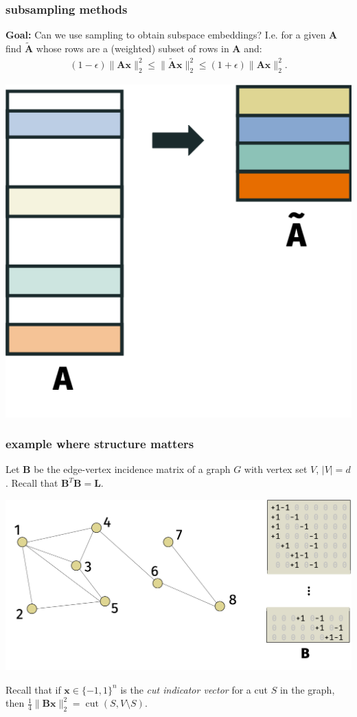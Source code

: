 \documentclass[compress]{beamer}
\newcommand{\bv}[1]{\mathbf{#1}}
\DeclareMathOperator{\cut}{cut}
\begin{document}
\begin{frame}
	\frametitle{subsampling methods}
	\textbf{Goal:} Can we use sampling to obtain subspace embeddings? I.e. for a given $\bv{A}$ find $\tilde{\bv{A}}$ whose rows are a (weighted) subset of rows in $\bv{A}$ and:
	\begin{align*}
		(1-\epsilon)\|\bv{A}\bv{x}\|_2^2 \leq \|\tilde{\bv{A}}\bv{x}\|_2^2 \leq (1+\epsilon)\|\bv{A}\bv{x}\|_2^2.
	\end{align*}
	\begin{center}
		\includegraphics[width=.4\textwidth]{subsampleA.png}
	\end{center}
	
	
\end{frame}

\begin{frame}
	\frametitle{example where structure matters}
	Let $\bv{B}$ be the edge-vertex incidence matrix of a graph $G$ with vertex set $V$, $|V| = d$. Recall that $\bv{B}^T\bv{B} = \bv{L}$.
	\begin{center}
		\includegraphics[width=\textwidth]{edge_vertex.png}
	\end{center}
	\vspace{-1em}
	
	Recall that if $\bv{x}\in \{-1,1\}^n$ is the \emph{cut indicator vector} for a cut $S$ in the graph, then $\frac{1}{4}\|\bv{B}\bv{x}\|_2^2 = \cut(S,V\setminus S)$.	
\end{frame}
\end{document}
